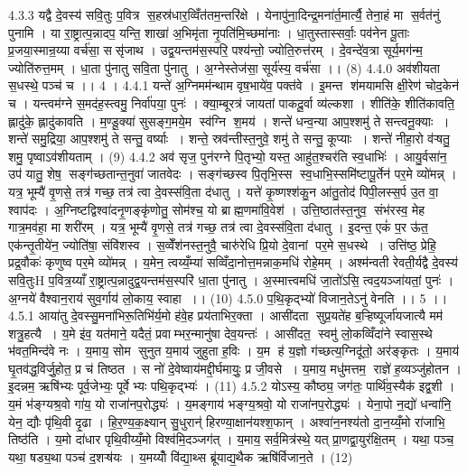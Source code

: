 4.3.3
यद्वै दे॒वस्य॑ सवि॒तुः प॒वित्र॑ स॒हस्र॑धार॒व्विँत॑तम॒न्तरि॑क्षे । येनापु॑ना॒दिन्द्र॒मना॑र्त॒मार्त्यै॒ तेना॒हं मा स॒र्वत॑नुं पुनामि । या रा॒ष्ट्रात्प॒न्नादप॒ यन्ति॒ शाखा॑ अ॒भिमृ॑ता नृ॒पति॑मि॒च्छमा॑नाः । धा॒तुस्तास्सर्वाः॒ पव॑नेन पू॒ताः प्र॒जया॒स्मान्र॒य्या वर्च॑सा॒ ससृ॑जाथ । उद्व॒यन्तम॑स॒स्परि॒ पश्य॑न्तो॒ ज्योति॒रुत्त॑रम् । दे॒वन्दे॑व॒त्रा सूर्य॒मग॑न्म॒ ज्योति॑रुत्त॒मम् । धा॒ता पु॑नातु सवि॒ता पु॑नातु । अ॒ग्नेस्तेज॑सा॒ सूर्य॑स्य॒ वर्च॑सा ।। (8)
4.4.0
अव॑शीयता स॒धस्थे॒ पञ्च॑ च ।। 4 ।
4.4.1
यन्ते॑ अ॒ग्निमम॑न्थाम वृष॒भाये॑व॒ पक्त॑वे । इ॒मन्त श॑मयामसि क्षी॒रेण॑ चोद॒केन॑ च । यन्त्वम॑ग्ने स॒मद॑ह॒स्त्वमु॒ निर्वा॑पया॒ पुनः॑ । क्या॒म्बूरत्र॑ जायतां पाकदू॒र्वा व्य॑ल्कशा । शीति॑के॒ शीति॑कावति॒ ह्लादु॑के॒ ह्लादु॑कावति । म॒ण्डू॒क्या॑ सुसङ्ग॒मये॒म स्व॑ग्नि श॒मय॑ । शन्ते॑ धन्व॒न्या आप॒श्शमु॑ ते सन्त्वनू॒क्याः । शन्ते॑ समु॒द्रिया॒ आप॒श्शमु॑ ते सन्तु॒ वर्ष्याः । शन्ते॒ स्रव॑न्तीस्त॒नुवे॒ शमु॑ ते सन्तु॒ कूप्याः । शन्ते॑ नीहा॒रो व॑ऱ्षतु॒ शमु॒ पृष्वाऽव॑शीयताम् । (9)
4.4.2
अव॑ सृज॒ पुन॑रग्ने पि॒तृभ्यो॒ यस्त॒ आहु॑त॒श्चर॑ति स्व॒धाभिः॑ । आयु॒र्वसा॑न॒ उप॑ यातु॒ शेष॒॒ सङ्ग॑च्छतान्त॒नुवा॑ जातवेदः । सङ्ग॑च्छस्व पि॒तृभि॒स्स स्व॒धाभि॒स्समि॑ष्टापू॒र्तेन॑ पर॒मे व्यो॑मन्न् । यत्र॒ भूम्यै॑ वृ॒णसे॒ तत्र॑ गच्छ॒ तत्र॑ त्वा दे॒वस्स॑वि॒ता द॑धातु । यत्ते॑ कृ॒ष्णश्श॑कु॒न आ॑तु॒तोद॑ पिपी॒लस्स॒र्प उ॒त वा॒ श्वाप॑दः । अ॒ग्निष्टद्विश्वा॑दनृ॒णङ्कृ॑णोतु॒ सोम॑श्च॒ यो ब्राह्म॒णमा॑वि॒वेश॑ । उत्ति॒ष्ठात॑स्त॒नुव॒॒ संभ॑रस्व॒ मेह गात्र॒मव॑हा॒ मा शरी॑रम् । यत्र॒ भूम्यै॑ वृ॒णसे॒ तत्र॑ गच्छ॒ तत्र॑ त्वा दे॒वस्स॑वि॒ता द॑धातु । इ॒दन्त॒ एकं॑ प॒र ऊ॑त॒ एक॑न्तृ॒तीये॑न॒ ज्योति॑षा॒ संवि॑शस्व । स॒व्वेँश॑नस्त॒नुवै॒ चारु॑रेधि प्रि॒यो दे॒वानां पर॒मे स॒धस्थे । उत्ति॑ष्ठ॒ प्रेहि॒ प्रद्र॒वौकः॑ कृणुष्व पर॒मे व्यो॑मन्न् । य॒मेन॒ त्वय्यँ॒म्या॑ सव्विँदा॒नोत्त॒मन्नाक॒मधि॑ रोहे॒मम् । अश्म॑न्वती रेवती॒र्यद्वै दे॒वस्य॑ सवि॒तुःH प॒वित्र॒य्याँ रा॒ष्ट्रात्प॒न्नादुद्व॒यन्तम॑स॒स्परि॑ धा॒ता पु॑नातु । अ॒स्मात्त्वमधि॑ जा॒तो॑ऽसि॒ त्वद॒यञ्जा॑यतां॒ पुनः॑ । अ॒ग्नये॑ वैश्वान॒राय॑ सुव॒र्गाय॑ लो॒काय॒ स्वाहा ।। (10)
4.5.0
प॒थि॒कृद्भ्यो॑ विजान॒तेऽनु॑ वेनति ।। 5 ।।
4.5.1
आया॑तु दे॒वस्सु॒मना॑भिरू॒तिभि॑र्य॒मो ह॑वे॒ह प्रय॑ताभिर॒क्ता । आसी॑दता सुप्र॒यते॑ह ब॒ऱ्हिष्यूर्जा॑यजात्यै मम॑ शत्रु॒हत्यै । य॒मे इ॑व॒ यत॑माने॒ यदैतं॒ प्रवाम्भर॒न्मानु॑षा देव॒यन्तः॑ । आसी॑दत॒॒ स्वमु॑ लो॒कव्विँदा॑ने स्वास॒स्थे भ॑वत॒मिन्द॑वे नः । य॒माय॒ सोम॑ सुनुत य॒माय॑ जुहुता ह॒विः । य॒म ह॑ य॒ज्ञो ग॑च्छत्य॒ग्निदू॑तो॒ अर॑ङ्कृतः । य॒माय॑ घृ॒तव॑द्ध॒विर्जु॒होत॒ प्र च॑ तिष्ठत । स नो॑ दे॒वेष्वाय॑मद्दी॒र्घमायुः॒ प्र जी॒वसे । य॒माय॒ मधु॑मत्तम॒॒ राज्ञे॑ ह॒व्यञ्जु॑होतन । इ॒दन्नम॒ ऋषि॑भ्यः पूर्व॒जेभ्यः॒ पूर्वेभ्यः पथि॒कृद्भ्यः॑ । (11)
4.5.2
योऽस्य॒ कौष्ठ्य॒ जग॑तः॒ पार्थि॑व॒स्यैक॑ इद्व॒शी । य॒मं भ॑ङ्ग्यश्र॒वो गा॑य॒ यो राजा॑नप॒रोद्ध्यः॑ । य॒मङ्गाय॑ भङ्ग्य॒श्रवो॒ यो राजा॑नप॒रोद्ध्यः॑ । येना॒पो न॒द्यो॑ धन्वा॑नि॒ येन॒ द्यौः पृ॑थि॒वी दृ॒ढा । हि॒र॒ण्य॒क॒क्ष्यान् सु॒धुरान्॑ हिरण्या॒क्षान॑यश्श॒फान् । अश्वा॑न॒नश्य॑तो दा॒न॒य्यँ॒मो रा॑जाभि॒ तिष्ठ॑ति । य॒मो दा॑धार पृथि॒वीय्यँ॒मो विश्व॑मि॒दञ्जग॑त् । य॒माय॒ सर्व॒मित्र॑स्थे॒ यत् प्रा॒णद्वा॒युर॑क्षि॒तम् । यथा॒ पञ्च॒ यथा॒ षड्य॒था पञ्च॑ द॒शऱ्ष॑यः । य॒मय्योँ वि॑द्या॒थ्स ब्रू॑याद्य॒थैक ऋषि॑र्विजान॒ते । (12)
